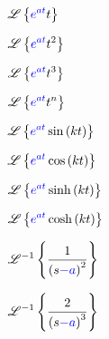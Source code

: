 \documentclass[multi={mymath},convert={density=1200}]{standalone}
\newenvironment{mymath}{$\displaystyle}{$}
\newcommand{\Lap}{\ensuremath{\mathscr{L}}}
\newcommand{\invLap}{\ensuremath{\mathscr{L}^{-1}}}
\begin{document}
\begin{mymath}
  \Lap\left\{ {\color{blue}e^{at}}t\right\}
\end{mymath}

\begin{mymath}
  \Lap\left\{ {\color{blue}e^{at}}t^{2}\right\}
\end{mymath}

\begin{mymath}
  \Lap\left\{ {\color{blue}e^{at}}t^{3}\right\}
\end{mymath}

\begin{mymath}
  \Lap\left\{ {\color{blue}e^{at}}t^{n}\right\} 
\end{mymath}

\begin{mymath}
  \Lap\left\{ 
    {\color{blue}e^{at}} \sin \left( kt \right)
  \right\} 
\end{mymath}

\begin{mymath}
  \Lap\left\{ 
    {\color{blue}e^{at}} \cos \left( kt \right)
  \right\} 
\end{mymath}

\begin{mymath}
  \Lap\left\{ 
    {\color{blue}e^{at}} \sinh \left( kt \right)
  \right\} 
\end{mymath}

\begin{mymath}
  \Lap\left\{ 
    {\color{blue}e^{at}} \cosh \left( kt \right)
  \right\} 
\end{mymath}

\begin{mymath}
  \invLap\left\{ 
    \frac{1}{\left(s{\color{blue}-a}\right)^{2}}
  \right\} 
\end{mymath}

\begin{mymath}
  \invLap\left\{ 
    \frac{2}{\left(s{\color{blue}-a}\right)^{3}} 
  \right\} 
\end{mymath}
\end{document}
